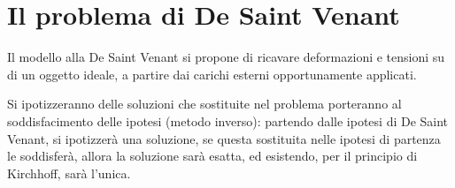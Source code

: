 

	
\section{Il problema di De Saint Venant}	
	Il modello alla De Saint Venant si propone di ricavare deformazioni e tensioni su di un oggetto ideale, a partire dai carichi esterni opportunamente applicati. 
	
	Si ipotizzeranno delle soluzioni che sostituite nel problema porteranno al soddisfacimento delle ipotesi (metodo inverso): partendo dalle ipotesi di De Saint Venant, si ipotizzerà una soluzione, se questa sostituita nelle ipotesi di partenza le soddisferà, allora la soluzione sarà esatta, ed esistendo, per il principio di Kirchhoff, sarà l'unica. \newline
	
